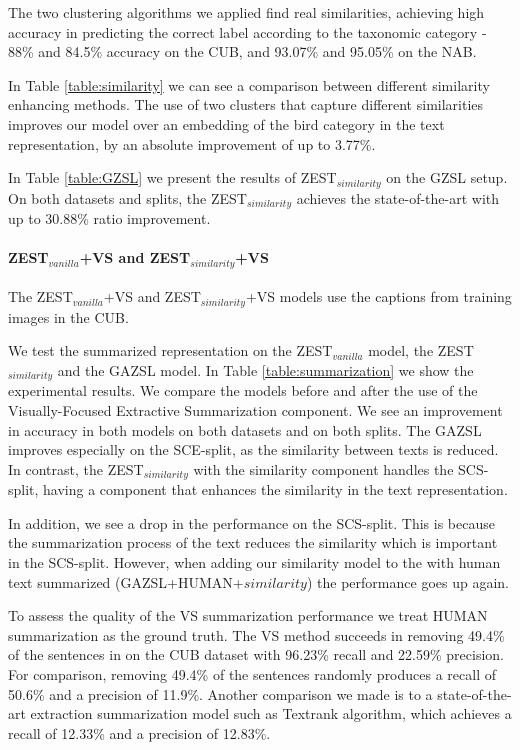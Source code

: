 \documentclass[11pt,a4paper]{article}
\begin{document}
The two clustering algorithms we applied find real similarities, achieving high accuracy in predicting the correct label according to the taxonomic category - 88\% and 84.5\% accuracy on the CUB, and 93.07\% and 95.05\% on the NAB. 

In Table \ref{table:similarity} we can see a comparison between different similarity enhancing methods. The use of two clusters that capture different similarities improves our model over an embedding of the bird category in the text representation, by an absolute improvement of up to 3.77\%.
\par

In Table \ref{table:GZSL} we present the results of ZEST$_{similarity}$ on the GZSL setup. On both datasets and splits, the ZEST$_{similarity}$ achieves the state-of-the-art with up to 30.88\% ratio improvement.

\paragraph{ZEST$_{vanilla}$+VS and ZEST$_{similarity}$+VS }
The ZEST$_{vanilla}$+VS and  ZEST$_{similarity}$+VS models use the captions from training images in the CUB. 

We test the summarized representation on the ZEST$_{vanilla}$ model, the ZEST$_{similarity}$ and the GAZSL \citep{zhu2018generative} model. In Table \ref{table:summarization} we show the experimental results. We compare the models before and after the use of the Visually-Focused  Extractive Summarization component. We see an improvement in accuracy in both models on both datasets and on both splits. The GAZSL improves especially on the SCE-split, as the similarity between texts is reduced. In contrast, the ZEST$_{similarity}$ with the similarity component handles the SCS-split, having a component that enhances the similarity in the text representation.  \par

In addition, we see a drop in the \citep{zhu2018generative} performance on the SCS-split. This is because the summarization process of the text reduces the similarity which is important in the SCS-split. However, when adding our similarity model to the \citep{zhu2018generative} with human text summarized (GAZSL+HUMAN+$similarity$) the performance goes up again.
\par  

To assess the quality of the VS summarization performance we treat HUMAN summarization as the ground truth. The VS method succeeds in removing 49.4\% of the sentences in on the CUB dataset with 96.23\% recall and 22.59\% precision. For comparison, removing 49.4\% of the sentences randomly produces a recall of 50.6\% and a precision of 11.9\%.
Another comparison we made is to a state-of-the-art extraction summarization model such as  Textrank \citep{mihalcea2004textrank} algorithm, which achieves a recall of 12.33\% and a precision of 12.83\%.
\end{document}
